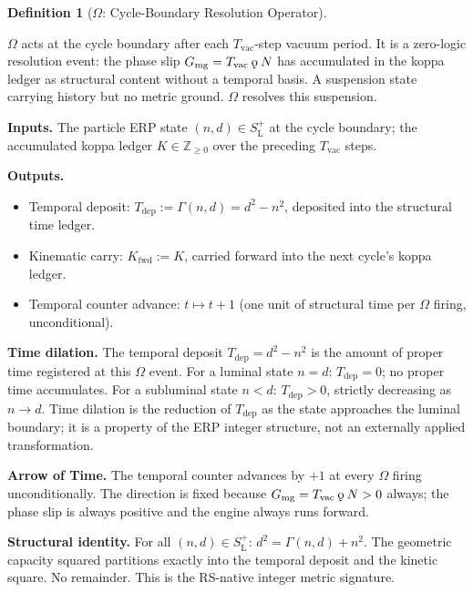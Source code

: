 \documentclass[11pt, letterpaper]{article}
\newcommand{\Z}{\mathbb{Z}}
\newcommand{\SLpos}{S_{\mathrm{L}}^{+}}
\newcommand{\koppa}{\mathbin{\text{\rm\k{o}}}}
\newcommand{\Tcharge}{\Gamma}
\theoremstyle{definition}
\newtheorem{definition}{Definition}[section]
\theoremstyle{plain}
\begin{document}
\begin{definition}[$\Omega$: Cycle-Boundary Resolution Operator]
\label{def:Omega}
\begin{rsbox}
$\Omega$ acts at the cycle boundary after each $T_{\mathrm{vac}}$-step
vacuum period.  It is a zero-logic resolution event: the phase slip
$G_{\mathrm{mg}} = T_{\mathrm{vac}}\koppa N$ has accumulated in the koppa
ledger as structural content without a temporal basis. A suspension state
carrying history but no metric ground.  $\Omega$ resolves this suspension.

\medskip
\textbf{Inputs.}
The particle ERP state $(n,d)\in\SLpos$ at the cycle boundary;
the accumulated koppa ledger $K\in\Z_{\geq 0}$ over the preceding
$T_{\mathrm{vac}}$ steps.

\medskip
\textbf{Outputs.}
\begin{itemize}
\item Temporal deposit: $T_{\mathrm{dep}} := \Tcharge(n,d) = d^2 - n^2$,
  deposited into the structural time ledger.
\item Kinematic carry: $K_{\mathrm{fwd}} := K$, carried forward into the
  next cycle's koppa ledger.
\item Temporal counter advance: $t \mapsto t+1$ (one unit of structural
  time per $\Omega$ firing, unconditional).
\end{itemize}

\medskip
\textbf{Time dilation.}  The temporal deposit $T_{\mathrm{dep}} =
d^2-n^2$ is the amount of proper time registered at this $\Omega$ event.
For a luminal state $n=d$: $T_{\mathrm{dep}}=0$; no proper time
accumulates.  For a subluminal state $n<d$: $T_{\mathrm{dep}}>0$,
strictly decreasing as $n\to d$.  Time dilation is the reduction of
$T_{\mathrm{dep}}$ as the state approaches the luminal boundary; it is
a property of the ERP integer structure, not an externally applied
transformation.

\medskip
\textbf{Arrow of Time.}  The temporal counter advances by $+1$ at every
$\Omega$ firing unconditionally.  The direction is fixed because
$G_{\mathrm{mg}} = T_{\mathrm{vac}}\koppa N > 0$ always; the phase slip
is always positive and the engine always runs forward.

\medskip
\textbf{Structural identity.}  For all $(n,d)\in\SLpos$:
$d^2 = \Tcharge(n,d) + n^2$.  The geometric capacity squared partitions
exactly into the temporal deposit and the kinetic square.  No remainder.
This is the RS-native integer metric signature.
\end{rsbox}
\end{definition}
\end{document}
